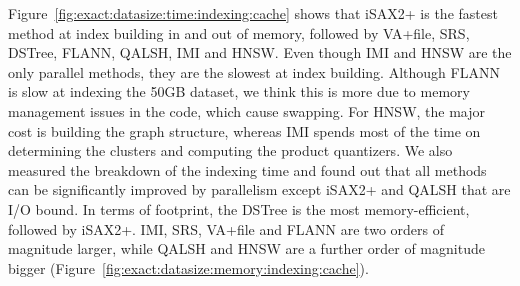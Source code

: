 {{\begin{comment}
{\color{black}\noindent\textbf{Discussion.}}
Figure~\ref{fig:exact:datasize:time:indexing:cache} shows that iSAX2+ is the fastest method at index building in and out of memory, followed by VA+file, SRS, DSTree, {\color{black}FLANN}, QALSH, IMI and HNSW. 
Even though IMI and HNSW are the only parallel methods, they are the slowest at index building. {\color{black}Although FLANN is slow at indexing the 50GB dataset, we think this is more due to memory management issues in the code which causes swapping.}
For HNSW, the major cost is building the graph structure, whereas IMI spends most of the time on determining the clusters and computing the product quantizers. 
In terms of footprint, the DSTree is the most memory-efficient, followed by iSAX2+. 
IMI, SRS, VA+file {\color{black}and FLANN} are two orders of magnitude larger, while {\color{black}QALSH} and HNSW are a further order of magnitude bigger (Figure~\ref{fig:exact:datasize:memory:indexing:cache}). 
\end{comment}
{\color{black}
Figure~\ref{fig:exact:datasize:time:indexing:cache} shows that iSAX2+ is the fastest method at index building in and out of memory, followed by VA+file, SRS, DSTree, {\color{black}FLANN}, QALSH, IMI and HNSW. 
Even though IMI and HNSW are the only parallel methods, they are the slowest at index building. {\color{black}Although FLANN is slow at indexing the 50GB dataset, we think this is more due to memory management issues in the code, which cause swapping.}
For HNSW, the major cost is building the graph structure, whereas IMI spends most of the time on determining the clusters and computing the product quantizers. We also measured the breakdown of the indexing time and found out that all methods can be significantly improved by parallelism except iSAX2+ and QALSH that are I/O bound.
In terms of footprint, the DSTree is the most memory-efficient, followed by iSAX2+. 
IMI, SRS, VA+file {\color{black}and FLANN} are two orders of magnitude larger, while {\color{black}QALSH} and HNSW are a further order of magnitude bigger (Figure~\ref{fig:exact:datasize:memory:indexing:cache}).}

}}
